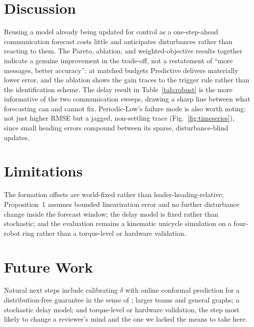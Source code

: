 \documentclass[10pt,conference]{IEEEtran}
\begin{document}
\vspace{-2pt}
\section{Discussion}

Reusing a model already being updated for control as a one-step-ahead communication forecast costs little and anticipates disturbances rather than reacting to them. The Pareto, ablation, and weighted-objective results together indicate a genuine improvement in the trade-off, not a restatement of ``more messages, better accuracy'': at matched budgets Predictive delivers materially lower error, and the ablation shows the gain traces to the trigger rule rather than the identification scheme. The delay result in Table~\ref{tab:robust} is the more informative of the two communication sweeps, drawing a sharp line between what forecasting can and cannot fix. Periodic-Low's failure mode is also worth noting: not just higher RMSE but a jagged, non-settling trace (Fig.~\ref{fig:timeseries}), since small heading errors compound between its sparse, disturbance-blind updates.

\vspace{-2pt}
\section{Limitations}

The formation offsets are world-fixed rather than leader-heading-relative; Proposition~1 assumes bounded linearization error and no further disturbance change inside the forecast window; the delay model is fixed rather than stochastic; and the evaluation remains a kinematic unicycle simulation on a four-robot ring rather than a torque-level or hardware validation.

\vspace{-2pt}
\section{Future Work}

Natural next steps include calibrating $\delta$ with online conformal prediction for a distribution-free guarantee in the sense of \cite{stamouli2024,lindemann2023}; larger teams and general graphs; a stochastic delay model; and torque-level or hardware validation, the step most likely to change a reviewer's mind and the one we lacked the means to take here.

\vspace{-2pt}
\end{document}
